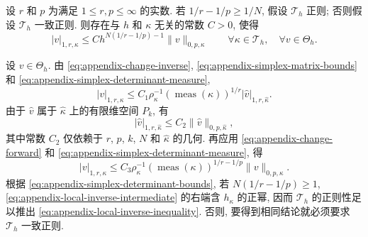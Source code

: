 \setcounter{statement}{5}
\begin{Lemma}\label{lem:appendix-local-inverse-inequality}
设 $r$ 和 $p$ 为满足 $1\leq r,p\leq\infty$ 的实数.
若 $1/r-1/p\geq1/N$, 假设 $\mathcal{T}_h$ 正则;
否则假设 $\mathcal{T}_h$ 一致正则.
则存在与 $h$ 和 $\kappa$ 无关的常数 $C>0$, 使得
\begin{equation}\label{eq:appendix-local-inverse-inequality}
|v|_{1,r,\kappa}
\leq
Ch^{N(1/r-1/p)-1}\|v\|_{0,p,\kappa}
\qquad
\forall\kappa\in\mathcal{T}_h,
\quad
\forall v\in\Theta_h.
\end{equation}
\end{Lemma}
\begin{Proof}
设 $v\in\Theta_h$. 由
\eqref{eq:appendix-change-inverse},
\eqref{eq:appendix-simplex-matrix-bounds} 和
\eqref{eq:appendix-simplex-determinant-measure},
\[
|v|_{1,r,\kappa}
\leq
C_1\rho_\kappa^{-1}
(\operatorname{meas}(\kappa))^{1/r}
|\hat v|_{1,r,\hat\kappa}.
\]
由于 $\hat v$ 属于 $\hat\kappa$ 上的有限维空间 $P_k$, 有
\[
|\hat v|_{1,r,\hat\kappa}
\leq
C_2\|\hat v\|_{0,p,\hat\kappa},
\]
其中常数 $C_2$ 仅依赖于 $r$, $p$, $k$, $N$ 和 $\hat\kappa$ 的几何.
再应用 \eqref{eq:appendix-change-forward} 和
\eqref{eq:appendix-simplex-determinant-measure}, 得
\begin{equation}\label{eq:appendix-local-inverse-intermediate}
|v|_{1,r,\kappa}
\leq
C_3\rho_\kappa^{-1}
(\operatorname{meas}(\kappa))^{1/r-1/p}
\|v\|_{0,p,\kappa}.
\end{equation}
根据 \eqref{eq:appendix-simplex-determinant-bounds},
若 $N(1/r-1/p)\geq1$,
\eqref{eq:appendix-local-inverse-intermediate} 的右端含 $h_\kappa$
的正幂, 因而 $\mathcal{T}_h$ 的正则性足以推出
\eqref{eq:appendix-local-inverse-inequality}.
否则, 要得到相同结论就必须要求 $\mathcal{T}_h$ 一致正则.
\end{Proof}


